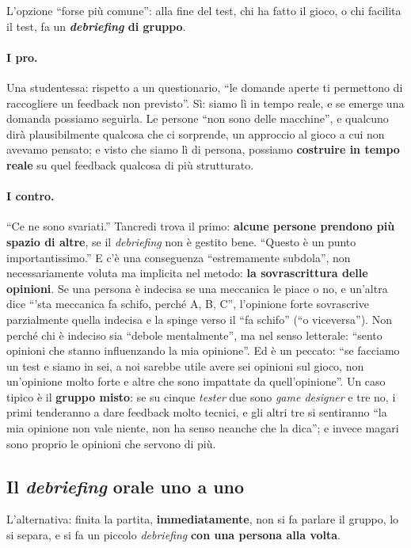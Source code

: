 L'opzione ``forse più comune'': alla fine del test, chi ha fatto il gioco, o chi facilita
il test, fa un \textbf{\emph{debriefing} di gruppo}.

\paragraph{I pro.} Una studentessa: rispetto a un questionario, ``le domande aperte ti
permettono di raccogliere un feedback non previsto''. Sì: siamo lì in tempo reale, e se
emerge una domanda possiamo seguirla. Le persone ``non sono delle macchine'', e qualcuno
dirà plausibilmente qualcosa che ci sorprende, un approccio al gioco a cui non avevamo
pensato; e visto che siamo lì di persona, possiamo \textbf{costruire in tempo reale} su
quel feedback qualcosa di più strutturato.

\paragraph{I contro.} ``Ce ne sono svariati.'' Tancredi trova il primo: \textbf{alcune
persone prendono più spazio di altre}, se il \emph{debriefing} non è gestito bene. ``Questo
è un punto importantissimo.'' E c'è una conseguenza ``estremamente subdola'', non
necessariamente voluta ma implicita nel metodo: \textbf{la sovrascrittura delle
opinioni}. Se una persona è indecisa se una meccanica le piace o no, e un'altra dice
``'sta meccanica fa schifo, perché A, B, C'', l'opinione forte sovrascrive parzialmente
quella indecisa e la spinge verso il ``fa schifo'' (``o viceversa''). Non perché chi è
indeciso sia ``debole mentalmente'', ma nel senso letterale: ``sento opinioni che stanno
influenzando la mia opinione''. Ed è un peccato: ``se facciamo un test e siamo in sei, a
noi sarebbe utile avere sei opinioni sul gioco, non un'opinione molto forte e altre che
sono impattate da quell'opinione''. Un caso tipico è il \textbf{gruppo misto}: se su
cinque \emph{tester} due sono \emph{game designer} e tre no, i primi tenderanno a dare
feedback molto tecnici, e gli altri tre si sentiranno ``la mia opinione non vale niente,
non ha senso neanche che la dica''; e invece magari sono proprio le opinioni che servono
di più.

\subsection{Il \emph{debriefing} orale uno a uno}

L'alternativa: finita la partita, \textbf{immediatamente}, non si fa parlare il gruppo,
lo si separa, e si fa un piccolo \emph{debriefing} \textbf{con una persona alla volta}.


